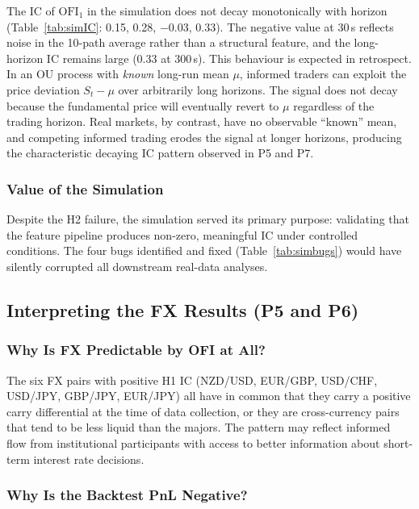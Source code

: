 \documentclass[12pt,a4paper]{article}
\theoremstyle{definition}
\theoremstyle{remark}
\newcommand{\OFI}{\mathrm{OFI}}
\begin{document}
The IC of $\OFI_1$ in the simulation does not decay monotonically
with horizon (Table~\ref{tab:simIC}: 0.15, 0.28, $-$0.03, 0.33).
The negative value at 30\,s reflects noise in the 10-path average
rather than a structural feature, and the long-horizon IC remains
large (0.33 at 300\,s). This behaviour is expected in retrospect.
In an OU process with \emph{known} long-run mean $\mu$, informed
traders can exploit the price deviation $S_t - \mu$ over arbitrarily
long horizons. The signal does not decay because the fundamental price
will eventually revert to $\mu$ regardless of the trading horizon.
Real markets, by contrast, have no observable ``known'' mean, and
competing informed trading erodes the signal at longer horizons,
producing the characteristic decaying IC pattern observed in P5 and P7.

\subsubsection{Value of the Simulation}

Despite the H2 failure, the simulation served its primary purpose:
validating that the feature pipeline produces non-zero, meaningful
IC under controlled conditions. The four bugs identified and fixed
(Table~\ref{tab:simbugs}) would have silently corrupted all
downstream real-data analyses.

\subsection{Interpreting the FX Results (P5 and P6)}
\label{sec:disc_fx}

\subsubsection{Why Is FX Predictable by OFI at All?}

The six FX pairs with positive H1 IC (NZD/USD, EUR/GBP, USD/CHF,
USD/JPY, GBP/JPY, EUR/JPY) all have in common that they carry a
positive carry differential at the time of data collection, or they
are cross-currency pairs that tend to be less liquid than the majors.
The pattern may reflect informed flow from institutional participants
with access to better information about short-term interest rate
decisions.

\subsubsection{Why Is the Backtest PnL Negative?}
\end{document}
